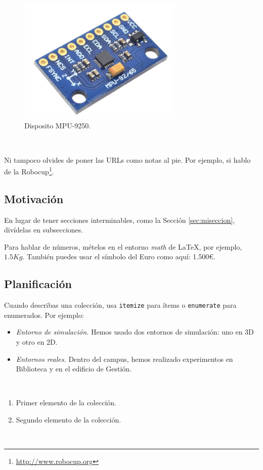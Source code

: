 \begin{figure} [h!]
  \begin{center}
    \includegraphics[width=8cm]{figs/mpu-9250}
  \end{center}
  \caption{Disposito MPU-9250.}
  \label{fig:mpu-9250}
\end{figure}\

Ni tampoco olvides de poner las URLs como notas al pie. Por ejemplo, si hablo de la Robocup\footnote{\url{http://www.robocup.org}}.

\subsection{Motivación}
\label{sec:subseccion}

En lugar de tener secciones interminables, como la Sección \ref{sec:miseccion}, divídelas en subsecciones.

Para hablar de números, mételos en el entorno \textit{math} de \LaTeX, por ejemplo, $1.5Kg$. También puedes usar el símbolo del Euro como aquí: 1.500\euro.

\subsection{Planificación}

Cuando describas una colección, usa \texttt{itemize} para ítems o \texttt{enumerate} para enumerados. Por ejemplo:

\begin{itemize}
 \item \textit{Entorno de simulación.} Hemos usado dos entornos de simulación: uno en 3D y otro en 2D.
 \item \textit{Entornos reales.} Dentro del campus, hemos realizado experimentos en Biblioteca y en el edificio de Gestión.
\end{itemize}\

\begin{enumerate}
 \item Primer elemento de la colección.
 \item Segundo elemento de la colección.
\end{enumerate}\

